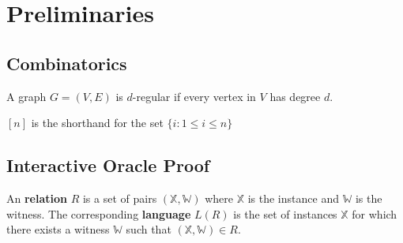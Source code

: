 \chapter{Preliminaries}

\section{Combinatorics}

\begin{definition}

A graph $G = (V, E)$ is $d$-regular if every vertex in $V$ has degree $d$.

\end{definition}

\begin{definition}[Set]

$[n]$ is the shorthand for the set $\{i: 1 \le i \le n\}$

\end{definition}

\section{Interactive Oracle Proof}

\begin{definition}[Relation]

An \textbf{relation} $R$ is a set of pairs $(\mathbb{X}, \mathbb{W})$ where $\mathbb{X}$ is the instance and $\mathbb{W}$ is the witness. The corresponding \textbf{language} $L(R)$ is the set of instances $\mathbb{X}$ for which there exists a witness $\mathbb{W}$ such that $(\mathbb{X}, \mathbb{W}) \in R$.

\end{definition}

